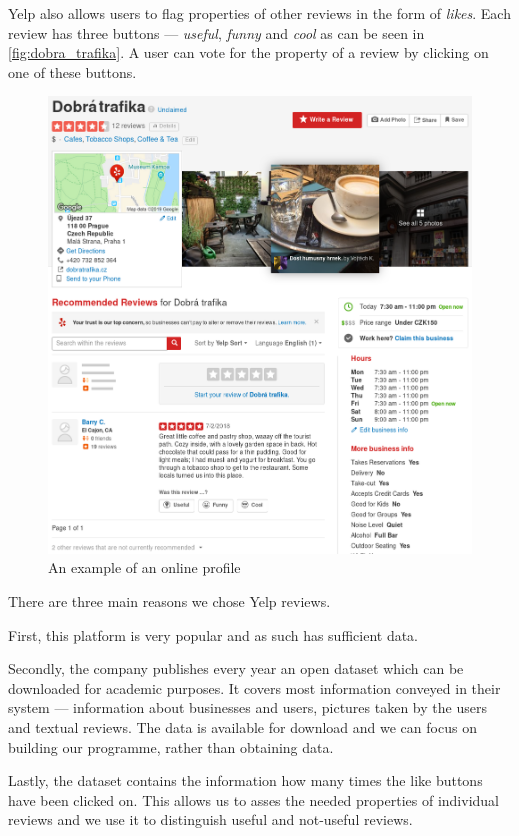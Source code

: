 Yelp also allows users to flag properties of other reviews in the form of \emph{likes}.
Each review has three buttons --- \emph{useful}, \emph{funny} and \emph{cool} as can be seen in \autoref{fig:dobra_trafika}.
A user can vote for the property of a review by clicking on one of these buttons.

\begin{figure}[ht]\centering
\includegraphics[width=130mm]{../img/dobra_trafika.png}
\caption{An example of an online profile}
\label{fig:dobra_trafika}
\end{figure}

There are three main reasons we chose Yelp reviews.

First, this platform is very popular and as such has sufficient data.

Secondly, the company publishes every year an open dataset which can be downloaded for academic
purposes.
It covers most information conveyed in their system ---  information about businesses and users, pictures taken by the users and textual reviews.
The data is available for download and we can focus on building our programme, rather than obtaining data.

Lastly, the dataset contains the information how many times the like buttons have been clicked on.
This allows us to asses the needed properties of individual reviews and
we use it to distinguish useful and not-useful reviews.

